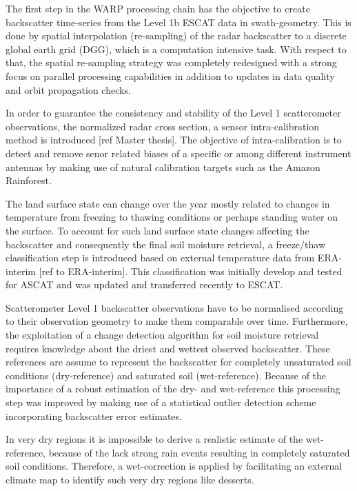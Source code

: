 \documentclass[a4paper,twocolumn]{esapub2005} %
\begin{document}
The first step in the WARP processing chain has the objective to create backscatter time-series from the Level 1b ESCAT data in swath-geometry.
This is done by spatial interpolation (re-sampling) of the radar backscatter to a discrete global earth grid (DGG), which is a computation intensive task.
With respect to that, the spatial re-sampling strategy was completely redesigned with a strong focus on parallel processing capabilities in addition to updates in data quality and orbit propagation checks. 

In order to guarantee the consistency and stability of the Level 1 scatterometer observations, the normalized radar cross section, a sensor intra-calibration method is introduced [ref Master thesis].
The objective of intra-calibration is to detect and remove senor related biases of a specific or among different instrument antennas by making use of natural calibration targets such as the Amazon Rainforest.

The land surface state can change over the year mostly related to changes in temperature from freezing to thawing conditions or perhaps standing water on the surface.
To account for such land surface state changes affecting the backscatter and consequently the final soil moisture retrieval, a freeze/thaw classification step is introduced based on external temperature data from ERA-interim [ref to ERA-interim].
This classification was initially develop and tested for ASCAT and was updated and transferred recently to ESCAT.

Scatterometer Level 1 backscatter observations have to be normalised according to their observation geometry to make them comparable over time. Furthermore, the exploitation of a change detection algorithm for soil moisture retrieval requires knowledge about the driest and wettest observed backscatter. These references are assume to represent the backscatter for completely unsaturated soil conditions (dry-reference) and saturated soil (wet-reference).
Because of the importance of a robust estimation of the dry- and wet-reference this processing step was improved by making use of a statistical outlier detection scheme incorporating backscatter error estimates.

In very dry regions it is impossible to derive a realistic estimate of the wet-reference, because of the lack strong rain events resulting in completely saturated soil conditions. Therefore, a wet-correction is applied by facilitating an external climate map to identify such very dry regions like desserts. 
\end{document}
